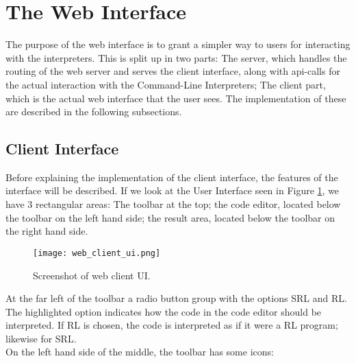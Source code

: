 
\section*{The Web Interface}

The purpose of the web interface is to grant a simpler way to users for interacting with the interpreters.
This is split up in two parts:
The server, which handles the routing of the web server and serves the client interface, along with api-calls for the actual interaction with the Command-Line Interpreters;
The client part, which is the actual web interface that the user sees.
The implementation of these are described in the following subsections.

\subsection*{Client Interface}


\noindent
Before explaining the implementation of the client interface, the features of the interface will be described.
If we look at the User Interface seen in Figure \ref{fig:web_client_ui}, we have 3 rectangular areas: The toolbar at the top; the code editor, located below the toolbar on the left hand side; the result area, located below the toolbar on the right hand side.

\begin{figure}[H]
  \texttt{[image: web\_client\_ui.png]}
  \caption{Screenshot of web client UI.}
  \label{fig:web_client_ui}
\end{figure}

\noindent
At the far left of the toolbar a radio button group with the options SRL and RL. The highlighted option indicates how the code in the code editor should be interpreted. If RL is chosen, the code is interpreted as if it were a RL program; likewise for SRL.\\
On the left hand side of the middle, the toolbar has some icons:\\

